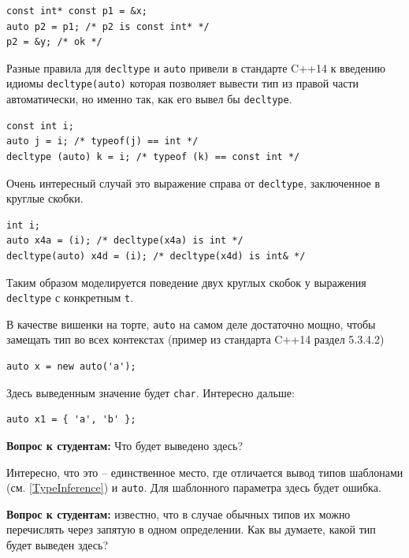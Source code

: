 \documentclass[a4paper,12pt,oneside]{article}
\newif\ifanswers
\begin{document}
\begin{lstlisting}
const int* const p1 = &x;
auto p2 = p1; /* p2 is const int* */
p2 = &y; /* ok */
\end{lstlisting}

Разные правила для \lstinline!decltype! и \lstinline!auto! привели в стандарте C++14 к введению идиомы \lstinline!decltype(auto)! которая позволяет вывести тип из правой части автоматически, но именно так, как его вывел бы \lstinline!decltype!.

\begin{lstlisting}
const int i;
auto j = i; /* typeof(j) == int */
decltype (auto) k = i; /* typeof (k) == const int */
\end{lstlisting}

Очень интересный случай это выражение справа от \lstinline!decltype!, заключенное в круглые скобки.

\begin{lstlisting}
int i;
auto x4a = (i); /* decltype(x4a) is int */
decltype(auto) x4d = (i); /* decltype(x4d) is int& */
\end{lstlisting}

Таким образом моделируется поведение двух круглых скобок у выражения \lstinline!decltype! с конкретным \lstinline!t!.

В качестве вишенки на торте, \lstinline!auto! на самом деле достаточно мощно, чтобы замещать тип во всех контекстах (пример из стандарта C++14 раздел 5.3.4.2)

\begin{lstlisting}
auto x = new auto('a');
\end{lstlisting}

Здесь выведенным значение будет \lstinline!char!. Интересно дальше:

\begin{lstlisting}
auto x1 = { 'a', 'b' };
\end{lstlisting}

\textbf{Вопрос к студентам:} Что будет выведено здесь? 

\ifanswers
Это довольно хитрый вопрос. Ответ ``массив'' неверный. В реальности будет выведен \lstinline!std::initializer_list<char>! -- тот самый новый тип, который позволил так лихо инициализировать вектор в самом начале.
\fi

Интересно, что это -- единственное место, где отличается вывод типов шаблонами (см. \ref{TypeInference}) и \lstinline!auto!. Для шаблонного параметра здесь будет ошибка.

\textbf{Вопрос к студентам:} известно, что в случае обычных типов их можно перечислять через запятую в одном определении. Как вы думаете, какой тип будет выведен здесь?
\end{document}
